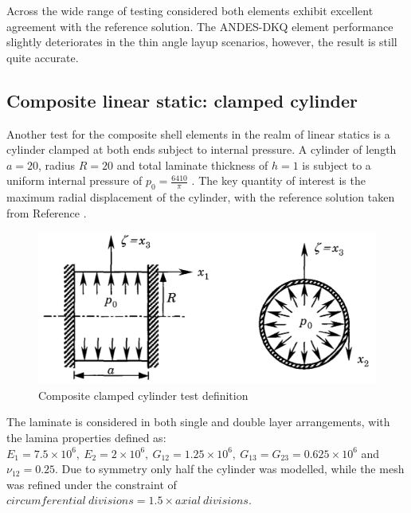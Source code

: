 Across the wide range of testing considered both elements exhibit excellent agreement with the reference solution. The ANDES-DKQ element performance slightly deteriorates in the thin angle layup scenarios, however, the result is still quite accurate.

\subsection{Composite linear static: clamped cylinder}

Another test for the composite shell elements in the realm of linear statics is a cylinder clamped at both ends subject to internal pressure. A cylinder of length $a = 20$, radius $R = 20$ and total laminate thickness of $h = 1$ is subject to a uniform internal pressure of $p_0 = \frac{6410}{\pi}$ \cite{reddy2004mechanics}. The key quantity of interest is the maximum radial displacement of the cylinder, with the reference solution taken from Reference \cite{reddy2004mechanics}.

\begin{figure}[H]
	\centering
	\includegraphics[width=12cm]{images/composite_clamped_cylinder_def.png}
	\caption{Composite clamped cylinder test definition}
	\label{fig:composite_clamped_cyl_def}
\end{figure}

The laminate is considered in both single and double layer arrangements, with the lamina properties defined as: $E_1 = 7.5\times10^6,\ E_2 = 2\times10^6,\ G_{12} = 1.25\times10^6,\ G_{13} = G_{23} = 0.625\times10^6$ and $\nu_{12} = 0.25$. Due to symmetry only half the cylinder was modelled, while the mesh was refined under the constraint of $circumferential\ divisions = 1.5\times axial\ divisions$.

